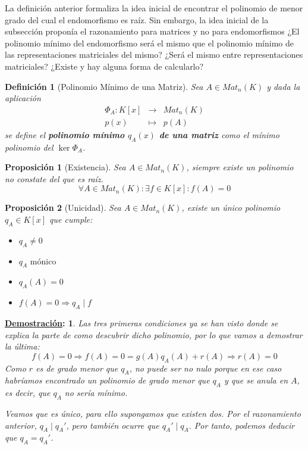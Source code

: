 \documentclass[10pt,a4paper,openright]{book}
\theoremstyle{break}
\newtheorem*{defi}{Definición}
\newtheorem*{prop}{Proposición}
\newtheorem*{demo}{\underline{Demostración}:}
\begin{document}
La definición anterior formaliza la idea inicial de encontrar el polinomio de menor grado del cual el endomorfismo es raíz. Sin embargo, la idea inicial de la subsección proponía el razonamiento para matrices y no para endomorfismos ¿El polinomio mínimo del endomorfismo será el mismo que el polinomio mínimo de las representaciones matriciales del mismo? ¿Será el mismo entre representaciones matriciales? ¿Existe y hay alguna forma de calcularlo?

\begin{defi}[Polinomio Mínimo de una Matriz]
Sea $A\in Mat_n(K)$ y dada la aplicación
\begin{eqnarray*}
\Phi_A:K[x] &\longrightarrow& Mat_n(K) \\ p(x) &\longmapsto& p(A) 
\end{eqnarray*}
se define el \textbf{polinomio mínimo $q_A(x)$ de una matriz} como el mínimo polinomio del $\ker \Phi_A$.
\end{defi}

\begin{prop}[Existencia]
Sea $A\in Mat_n(K)$, siempre existe un polinomio no constate del que es raíz.
$$
\forall A\in Mat_n(K): \exists f\in K[x]: f(A)=0
$$
\end{prop}

\begin{prop}[Unicidad]
Sea $A\in Mat_n(K)$, existe un único polinomio $q_A\in K[x]$ que cumple:
\begin{itemize}
\item $q_A\neq 0$
\item $q_A \mbox{ mónico }$
\item $q_A(A)=0$
\item $f(A)=0\Rightarrow q_A\mid f$
\end{itemize}
\end{prop}
\begin{demo}
Las tres primeras condiciones ya se han visto donde se explica la parte de como descubrir dicho polinomio, por lo que vamos a demostrar la última:
$$
f(A) = 0 \Rightarrow f(A)=0= g(A)q_A(A)+r(A)\Rightarrow r(A)=0
$$
Como $r$ es de grado menor que $q_A$, no puede ser no nulo porque en ese caso habríamos encontrado un polinomio de grado menor que $q_A$ y que se anula en $A$, es decir, que $q_A$ no sería mínimo.

Veamos que es único, para ello supongamos que existen dos. Por el razonamiento anterior, $q_A\mid q_A'$, pero también ocurre que $q_A'\mid q_A$. Por tanto, podemos deducir que $q_A = q_A'
$.
\end{demo}
\end{document}

